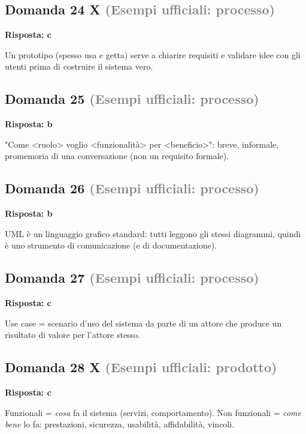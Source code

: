 \documentclass[a4paper,11pt]{article}
\begin{document}
\subsection*{Domanda 24 X \hfill {\small \textcolor{gray}{(Esempi ufficiali: processo)}}}
\textbf{Risposta: c}\par
Un prototipo (spesso usa e getta) serve a chiarire requisiti e validare idee con gli utenti prima di costruire il sistema vero.



\subsection*{Domanda 25 \hfill {\small \textcolor{gray}{(Esempi ufficiali: processo)}}}
\textbf{Risposta: b}\par
"Come \textless{}ruolo\textgreater{} voglio \textless{}funzionalità\textgreater{} per \textless{}beneficio\textgreater{}": breve, informale, promemoria di una conversazione (non un requisito formale).



\subsection*{Domanda 26 \hfill {\small \textcolor{gray}{(Esempi ufficiali: processo)}}}
\textbf{Risposta: b}\par
UML è un linguaggio grafico standard: tutti leggono gli stessi diagrammi, quindi è uno strumento di comunicazione (e di documentazione).



\subsection*{Domanda 27 \hfill {\small \textcolor{gray}{(Esempi ufficiali: processo)}}}
\textbf{Risposta: c}\par
Use case = scenario d'uso del sistema da parte di un attore che produce un risultato di valore per l'attore stesso.



\subsection*{Domanda 28 X \hfill {\small \textcolor{gray}{(Esempi ufficiali: prodotto)}}}
\textbf{Risposta: c}\par
Funzionali = \textit{cosa} fa il sistema (servizi, comportamento). Non funzionali = \textit{come bene} lo fa: prestazioni, sicurezza, usabilità, affidabilità, vincoli.
\end{document}
